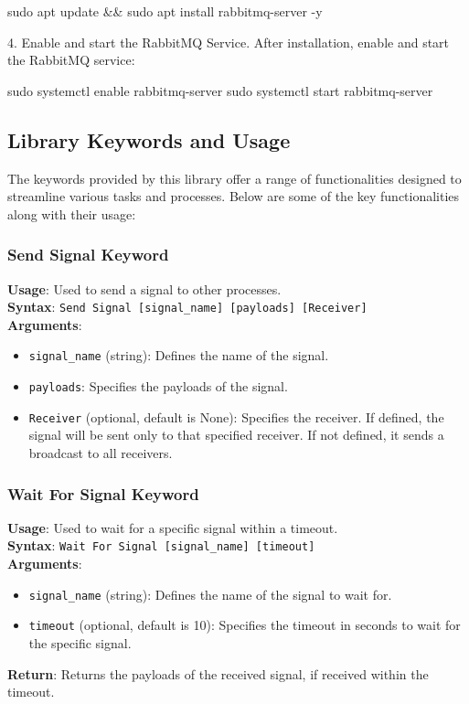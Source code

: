 \begin{robotlog}
sudo apt update && sudo apt install rabbitmq-server -y
\end{robotlog}

4. Enable and start the RabbitMQ Service. After installation, enable and start the RabbitMQ service:

\begin{robotlog}
sudo systemctl enable rabbitmq-server
sudo systemctl start rabbitmq-server
\end{robotlog}

\subsection{Library Keywords and Usage}
\label{subsec:keyword-usage}

The keywords provided by this library offer a range of functionalities designed to streamline various tasks and processes. Below are some of the key functionalities along with their usage:

\subsubsection{Send Signal Keyword}
\textbf{Usage}: Used to send a signal to other processes. \\
\textbf{Syntax}: \texttt{Send Signal [signal\_name] [payloads] [Receiver]} \\
\textbf{Arguments}:
\begin{itemize}
    \item \texttt{signal\_name} (string): Defines the name of the signal.
    \item \texttt{payloads}: Specifies the payloads of the signal.
    \item \texttt{Receiver} (optional, default is None): Specifies the receiver. If defined, the signal will be sent only to that specified receiver. If not defined, it sends a broadcast to all receivers.
\end{itemize}

\subsubsection{Wait For Signal Keyword}
\textbf{Usage}: Used to wait for a specific signal within a timeout. \\
\textbf{Syntax}: \texttt{Wait For Signal [signal\_name] [timeout]} \\
\textbf{Arguments}:
\begin{itemize}
    \item \texttt{signal\_name} (string): Defines the name of the signal to wait for.
    \item \texttt{timeout} (optional, default is 10): Specifies the timeout in seconds to wait for the specific signal.
\end{itemize}
\textbf{Return}: Returns the payloads of the received signal, if received within the timeout.

